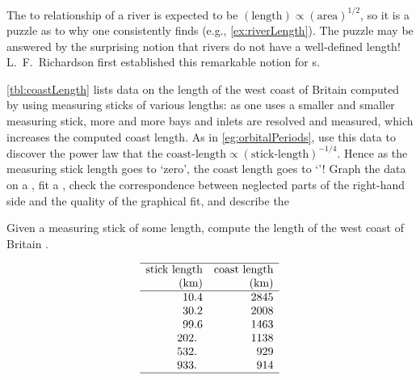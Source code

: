\begin{exercise} \label{ex:coastlength} 
The  to  relationship of a river is expected to be \((\text{length})\propto(\text{area})^{1/2}\), so it is a puzzle as to why one consistently finds  (e.g., \cref{ex:riverLength}).
The puzzle may be answered by the surprising notion that rivers do not have a well-defined length!
L.~F.~Richardson first established this remarkable notion for s.

\cref{tbl:coastLength} lists data on the length of the west coast of Britain computed by using measuring sticks of various lengths: as one uses a smaller and smaller measuring stick, more and more bays and inlets are resolved and measured, which increases the computed coast length. 
\setbox\ajrqrbox\hbox{}%
\marginajrbox%
As in \cref{eg:orbitalPeriods}, use this data to discover the power law that the \(\text{coast-length}\propto(\text{stick-length})^{-1/4}\).
Hence as the measuring stick length goes to `zero', the coast length goes to `'!  
Graph the data on a , fit a , check the correspondence between neglected parts of the right-hand side and the quality of the graphical fit, and describe the 
\begin{table}
\caption{Given a measuring stick of some length, compute the length of the west coast of Britain \cite[Plate~33]{Mandelbrot1982}.}
\label{tbl:coastLength}
\begin{equation*}
\begin{array}{rr} \hline
\text{stick length}&\text{coast length}\\
(\text{km})&\text{(km)}\\\hline
     10.4 & 2845 \\
     30.2 & 2008 \\
     99.6 & 1463 \\
    202.\phantom{0} & 1138 \\
    532.\phantom{0} &  929 \\
    933.\phantom{0} &  914 \\
\hline
\end{array}
\end{equation*}
\end{table}%
\end{exercise}




